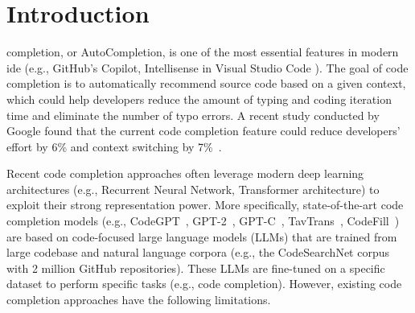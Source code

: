 
\IEEEdisplaynontitleabstractindextext
\IEEEpeerreviewmaketitle
\ifCLASSOPTIONcompsoc
{}
\else
\section{Introduction}
\label{sec:introduction}
\fi

 completion, or AutoCompletion, is one of the most essential features in modern \gls{ide} (e.g., GitHub's Copilot, Intellisense in Visual Studio Code \cite{intelliSense}).
The goal of code completion is to automatically recommend source code based on a given context, which could help developers reduce the amount of typing and coding iteration time and eliminate the number of typo errors.
A recent study conducted by Google found that the current code completion feature could reduce developers' effort by 6\% and context switching by 7\%~\cite{ml2022google}.



Recent code completion approaches often leverage modern deep learning architectures (e.g., Recurrent Neural Network, Transformer architecture) to exploit their strong representation power.
More specifically, state-of-the-art code completion models (e.g., CodeGPT~\cite{lu2021codexglue}, GPT-2~\cite{radford2019language}, GPT-C~\cite{svyatkovskiy2020intellicode}, TavTrans~\cite{kim2021code}, CodeFill~\cite{izadi2022codefill}) are based on code-focused large language models (LLMs) that are trained from large codebase and natural language corpora (e.g., the CodeSearchNet corpus with 2 million GitHub repositories). These LLMs are fine-tuned on a specific dataset to perform specific tasks (e.g., code completion).
However, existing code completion approaches have the following limitations.

